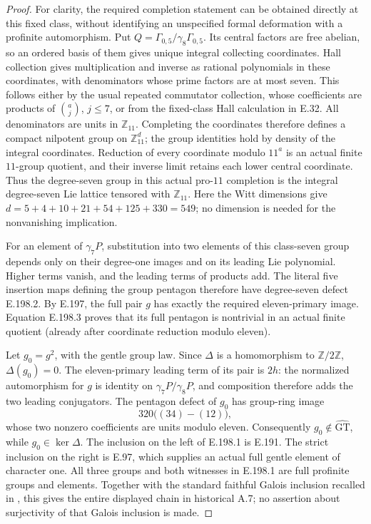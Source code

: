 \begin{proof}
For clarity, the required completion statement can be obtained
directly at this fixed class, without identifying an unspecified
formal deformation with a profinite automorphism.  Put
\(Q=\Gamma_{0,5}/\gamma_8\Gamma_{0,5}\).
Its central factors are free abelian, so an ordered basis of
them gives unique integral collecting coordinates.  Hall
collection gives multiplication and inverse as rational
polynomials in these coordinates, with denominators whose
prime factors are at most seven.  This follows either by the
usual repeated commutator collection, whose coefficients are
products of \(\binom{a}{j}\), \(j\le7\), or from the
fixed-class Hall calculation in E.32.  All denominators are
units in \(\mathbb Z_{11}\).  Completing the coordinates
therefore defines a compact nilpotent group on
\(\mathbb Z_{11}^{d}\); the group identities hold by density
of the integral coordinates.  Reduction of every coordinate
modulo \(11^a\) is an actual finite \(11\)-group quotient,
and their inverse limit retains each lower central coordinate.
Thus the degree-seven group in this actual pro-\(11\)
completion is the integral degree-seven Lie lattice tensored
with \(\mathbb Z_{11}\).  Here the Witt dimensions give
\(d=5+4+10+21+54+125+330=549\); no dimension is needed
for the nonvanishing implication.

For an element of \(\gamma_7P\), substitution into two
elements of this class-seven group depends only on their
degree-one images and on its leading Lie polynomial.
Higher terms vanish, and the leading terms of products add.
The literal five insertion maps defining the group pentagon
therefore have degree-seven defect E.198.2.  By E.197, the
full pair \(g\) has exactly the required eleven-primary
image.  Equation E.198.3 proves that its full pentagon is
nontrivial in an actual finite quotient (already after
coordinate reduction modulo eleven).

Let \(g_0=g^2\), with the gentle group law.  Since
\(\Delta\) is a homomorphism to \(\mathbb Z/2\mathbb Z\),
\(\Delta(g_0)=0\).  The eleven-primary leading term of its
pair is \(2h\): the normalized automorphism for \(g\)
is identity on \(\gamma_7P/\gamma_8P\), and composition
therefore adds the two leading conjugators.  The pentagon
defect of \(g_0\) has group-ring image
\[
                 320\bigl((34)-(12)\bigr),
\tag{E.198.4}
\]
whose two nonzero coefficients are units modulo eleven.
Consequently \(g_0\notin\widehat{\mathrm{GT}}\), while
\(g_0\in\ker\Delta\).  The inclusion on the left of
E.198.1 is E.191.  The strict inclusion on the right is
E.97, which supplies an actual full gentle element of
character one.  All three groups and both witnesses in
E.198.1 are full profinite groups and elements.  Together
with the standard faithful Galois inclusion recalled in
\citet[\S1, p.~657]{LitSchneps2006Automorphisms}, this gives
the entire displayed chain in historical A.7; no assertion
about surjectivity of that Galois inclusion is made.
\end{proof}

